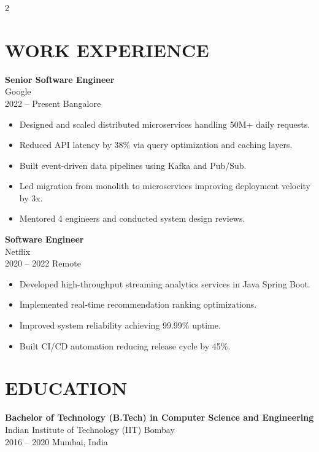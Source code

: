 \documentclass[11pt,a4paper]{article}
\newenvironment{resumelist}{
  \begin{itemize}[leftmargin=*,itemsep=2pt,topsep=1pt]
}{
  \end{itemize}
}
\begin{document}
\begin{paracol}{2}

\section*{WORK EXPERIENCE}

\textbf{Senior Software Engineer} \\
Google \\
{\color{accent} 2022 -- Present} \hfill {\color{accent} Bangalore}

\begin{resumelist}
\item Designed and scaled distributed microservices handling 50M+ daily requests.
\item Reduced API latency by 38\% via query optimization and caching layers.
\item Built event-driven data pipelines using Kafka and Pub/Sub.
\item Led migration from monolith to microservices improving deployment velocity by 3x.
\item Mentored 4 engineers and conducted system design reviews.
\end{resumelist}

\vspace{6pt}

\textbf{Software Engineer} \\
Netflix \\
{\color{accent} 2020 -- 2022} \hfill {\color{accent} Remote}

\begin{resumelist}
\item Developed high-throughput streaming analytics services in Java  Spring Boot.
\item Implemented real-time recommendation ranking optimizations.
\item Improved system reliability achieving 99.99\% uptime.
\item Built CI/CD automation reducing release cycle by 45\%.
\end{resumelist}

\vspace{6pt}

\section*{EDUCATION}

\textbf{Bachelor of Technology (B.Tech) in Computer Science and Engineering} \\
Indian Institute of Technology (IIT) Bombay \\
{\color{accent} 2016 -- 2020} \hfill {\color{accent} Mumbai, India}


\end{paracol}
\end{document}
